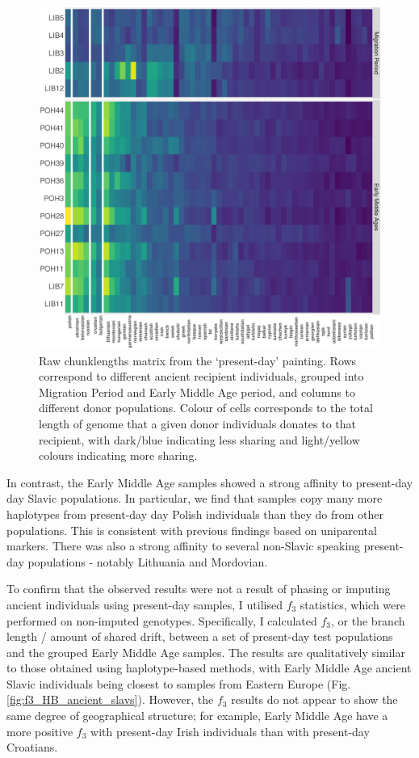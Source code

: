 \begin{figure}[htp]
    \centering
    \includegraphics[width=1.0\textwidth]{../images/chapter5/copymatrix_moderns_ancient_slavs.pdf}
    \caption{Raw chunklengths matrix from the `present-day' painting. Rows correspond to different ancient recipient individuals, grouped into Migration Period and Early Middle Age period, and columns to different donor populations. Colour of cells corresponds to the total length of genome that a given donor individuals donates to that recipient, with dark/blue  indicating less sharing and light/yellow colours indicating more sharing.}
    \label{fig:copymatrix_moderns_ancient_slavs}
\end{figure} 

In contrast, the Early Middle Age samples showed a strong affinity to present-day day Slavic populations. In particular, we find that samples copy many more haplotypes from present-day day Polish individuals than they do from other populations. This is consistent with previous findings based on uniparental markers. There was also a strong affinity to several non-Slavic speaking present-day populations - notably Lithuania and Mordovian. 

To confirm that the observed results were not a result of phasing or imputing ancient individuals using present-day samples, I utilised $f_{3}$ statistics, which were performed on non-imputed genotypes. Specifically, I calculated $f_{3}$, or the branch length / amount of shared drift, between a set of present-day test populations and the grouped Early Middle Age samples. The results are qualitatively similar to those obtained using haplotype-based methods, with Early Middle Age ancient Slavic individuals being closest to samples from Eastern Europe (Fig. \ref{fig:f3_HB_ancient_slavs}). However, the $f_{3}$ results do not appear to show the same degree of geographical structure; for example, Early Middle Age have a more positive $f_{3}$ with present-day Irish individuals than with present-day Croatians.

